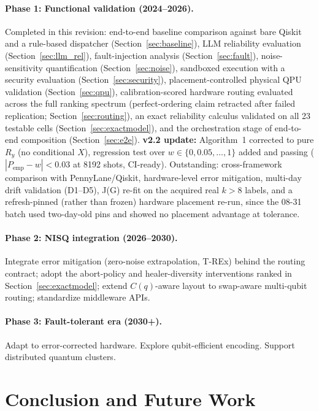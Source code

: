﻿\documentclass[12pt,a4paper]{article}
\begin{document}
\paragraph{Phase 1: Functional validation (2024--2026).} Completed in this revision: end-to-end baseline comparison against bare Qiskit and a rule-based dispatcher (Section~\ref{sec:baseline}), LLM reliability evaluation (Section~\ref{sec:llm_rel}), fault-injection analysis (Section~\ref{sec:fault}), noise-sensitivity quantification (Section~\ref{sec:noise}), sandboxed execution with a security evaluation (Section~\ref{sec:security}), placement-controlled physical QPU validation (Section~\ref{sec:qpu}), calibration-scored hardware routing evaluated across the full ranking spectrum (perfect-ordering claim retracted after failed replication; Section~\ref{sec:routing}), an exact reliability calculus validated on all 23 testable cells (Section~\ref{sec:exactmodel}), and the orchestration stage of end-to-end composition (Section~\ref{sec:e2e}). \textbf{v2.2 update:} Algorithm~1 corrected to pure $R_y$ (no conditional $X$), regression test over $w\in\{0,0.05,\ldots,1\}$ added and passing ($|P_{\mathrm{emp}}-w|<0.03$ at 8192 shots, CI-ready). Outstanding: cross-framework comparison with PennyLane/Qiskit, hardware-level error mitigation, multi-day drift validation (D1--D5), J(G) re-fit on the acquired real $k{>}8$ labels, and a refresh-pinned (rather than frozen) hardware placement re-run, since the 08-31 batch used two-day-old pins and showed no placement advantage at tolerance.

\paragraph{Phase 2: NISQ integration (2026--2030).} Integrate error mitigation (zero-noise extrapolation, T-REx) behind the routing contract; adopt the abort-policy and healer-diversity interventions ranked in Section~\ref{sec:exactmodel}; extend $C(q)$-aware layout to swap-aware multi-qubit routing; standardize middleware APIs.

\paragraph{Phase 3: Fault-tolerant era (2030+).} Adapt to error-corrected hardware. Explore qubit-efficient encoding. Support distributed quantum clusters.


\section{Conclusion and Future Work}\label{sec:conclusion}
\end{document}
